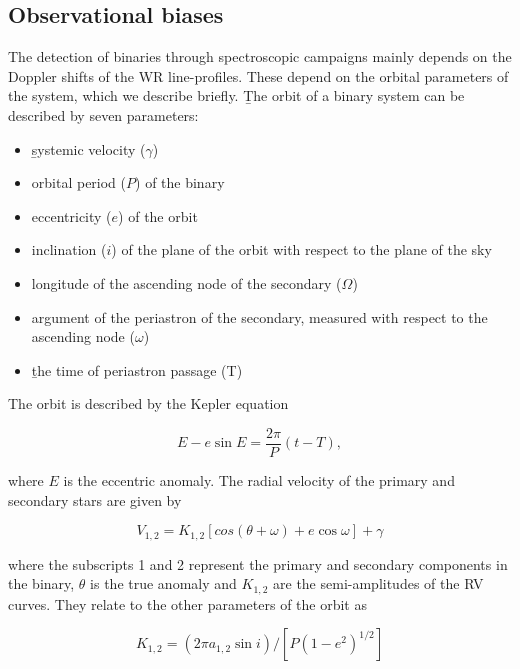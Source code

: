 \subsection{Observational biases} \label{sect:obs_bias_intro}

The detection of binaries through spectroscopic campaigns mainly depends on the Doppler shifts of the WR line-profiles. These depend on the orbital parameters of the system, which we describe briefly. \b{The orbit of a binary system can be described by seven parameters:}

\begin{itemize}
    \item \b{systemic velocity} ($\gamma$)
    \item orbital period ($P$) of the binary
    \item eccentricity ($e$) of the orbit
    \item inclination ($i$) of the plane of the orbit with respect to the plane of the sky
    \item longitude of the ascending node of the secondary ($\Omega$)
    \item argument of the periastron of the secondary, measured with respect to the ascending node ($\omega$)
    \item \b{the time of periastron passage (T)}
\end{itemize}

The orbit is described by the Kepler equation

\begin{equation}
E - e \sin E = \frac{2 \pi}{P} (t - T),
\end{equation}

where $E$ is the eccentric anomaly. The radial velocity of the primary and secondary stars are given by

\begin{equation}
V_{1,2} = K_{1,2} [cos(\theta + \omega) + e \cos \omega] + \gamma
\end{equation}

where the subscripts 1 and 2 represent the primary and secondary components in the binary, $\theta$ is the true anomaly and $K_{1,2}$ are the semi-amplitudes of the RV curves. They relate to the other parameters of the orbit as

\begin{equation}
K_{1,2} = (2 \pi a_{1,2} \sin i)/[P(1-e^2)^{1/2}]
\end{equation}


